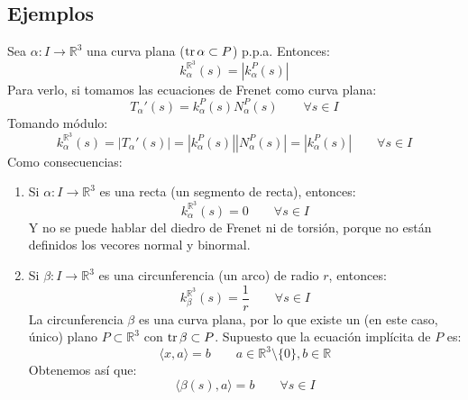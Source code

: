 \subsection{Ejemplos}
\begin{ejercicio}
    Sea $\alpha:I\to \mathbb{R}^3$ una curva plana ($\operatorname{tr}\alpha\subset P$) p.p.a. Entonces:
    \begin{equation*}
        k_\alpha^{\mathbb{R}^3}(s) = |k_\alpha^{P}(s)|
    \end{equation*}
    Para verlo, si tomamos las ecuaciones de Frenet como curva plana:
    \begin{equation*}
        T_\alpha'(s) = k_\alpha^P(s) N_\alpha^P(s) \qquad \forall s\in I
    \end{equation*}
    Tomando módulo:
    \begin{equation*}
        k_\alpha^{\mathbb{R}^3}(s) = |T_\alpha'(s)| = |k_\alpha^P(s)| |N_\alpha^P(s)| = |k_\alpha^P(s)| \qquad \forall s\in I
    \end{equation*}
    Como consecuencias:
    \begin{enumerate}
        \item Si $\alpha:I\to \mathbb{R}^3$ es una recta (un segmento de recta), entonces:
            \begin{equation*}
                k_\alpha^{\mathbb{R}^3}(s) = 0 \qquad \forall s\in I
            \end{equation*}
            Y no se puede hablar del diedro de Frenet ni de torsión, porque no están definidos los vecores normal y binormal.
        \item Si $\beta:I\to \mathbb{R}^3$ es una circunferencia (un arco) de radio $r$, entonces:
            \begin{equation*}
                k_\beta^{\mathbb{R}^3}(s) = \frac{1}{r} \qquad \forall s\in I
            \end{equation*}
            La circunferencia $\beta$ es una curva plana, por lo que existe un (en este caso, único) plano $P\subset \mathbb{R}^3$ con $\operatorname{tr}\beta\subset P$. Supuesto que la ecuación implícita de $P$ es:
            \begin{equation*}
                \langle x,a \rangle  = b \qquad a\in \mathbb{R}^3\setminus\{0\}, b\in \mathbb{R}
            \end{equation*}
            Obtenemos así que:
            \begin{equation*}
                \langle \beta(s),a \rangle  = b \qquad \forall s\in I
            \end{equation*}

\end{enumerate}
\end{ejercicio}
